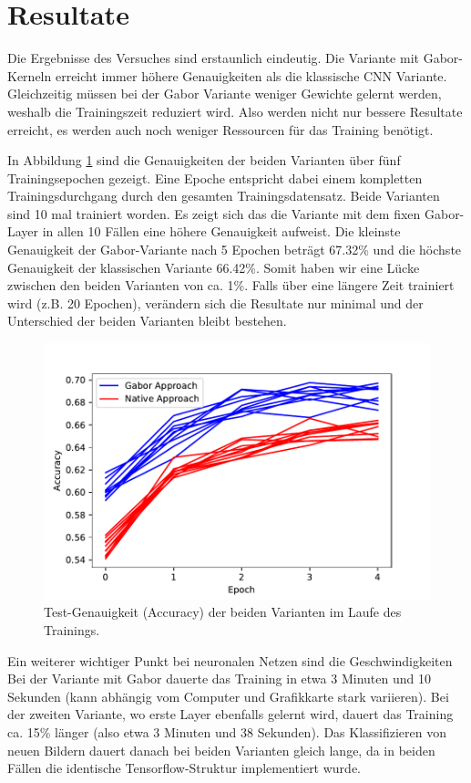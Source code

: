 \section{Resultate}

Die Ergebnisse des Versuches sind erstaunlich eindeutig.
Die Variante mit Gabor-Kerneln erreicht immer höhere Genauigkeiten als die klassische CNN Variante.
Gleichzeitig müssen bei der Gabor Variante weniger Gewichte gelernt werden, weshalb die Trainingszeit reduziert wird.
Also werden nicht nur bessere Resultate erreicht, es werden auch noch weniger Ressourcen für das Training benötigt.

In Abbildung \ref{fig:acc} sind die Genauigkeiten der beiden Varianten über fünf Trainingsepochen gezeigt.
Eine Epoche entspricht dabei einem kompletten Trainingsdurchgang durch den gesamten Trainingsdatensatz.
Beide Varianten sind 10 mal trainiert worden. 
Es zeigt sich das die Variante mit dem fixen Gabor-Layer in allen 10 Fällen eine höhere Genauigkeit aufweist.
Die kleinste Genauigkeit der Gabor-Variante nach 5 Epochen beträgt 67.32\% und die höchste Genauigkeit der klassischen Variante 66.42\%.
Somit haben wir eine Lücke zwischen den beiden Varianten von ca. 1\%.
Falls über eine längere Zeit trainiert wird (z.B. 20 Epochen), verändern sich die Resultate nur minimal und der Unterschied der beiden Varianten bleibt bestehen.

\begin{figure}
	\centering
	\includegraphics[width=0.7\linewidth]{./papers/visuell/images/accuracy}
	\caption{Test-Genauigkeit (Accuracy) der beiden Varianten im Laufe des Trainings.}
	\label{fig:acc}
\end{figure}

Ein weiterer wichtiger Punkt bei neuronalen Netzen sind die Geschwindigkeiten
Bei der Variante mit Gabor dauerte das Training in etwa 3 Minuten und 10 Sekunden (kann abhängig vom Computer und Grafikkarte stark variieren).
Bei der zweiten Variante, wo erste Layer ebenfalls gelernt wird, dauert das Training ca. 15\% länger (also etwa 3 Minuten und 38 Sekunden).
Das Klassifizieren von neuen Bildern dauert danach bei beiden Varianten gleich lange, da in beiden Fällen die identische Tensorflow-Struktur implementiert wurde.